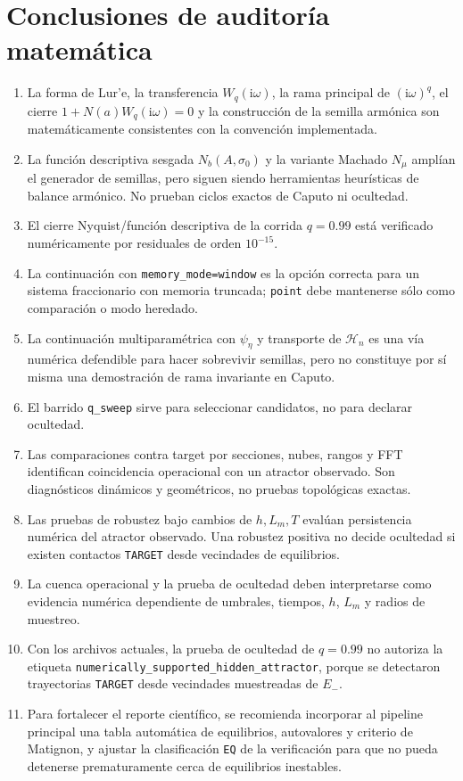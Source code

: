\documentclass[11pt]{article}
\newcommand{\ii}{\mathrm{i}}
\newcommand{\TARGET}{\texttt{TARGET}}
\begin{document}
\section{Conclusiones de auditoría matemática}

\begin{enumerate}
\item La forma de Lur'e, la transferencia \(W_q(\ii\omega)\), la rama
principal de \((\ii\omega)^q\), el cierre \(1+N(a)W_q(\ii\omega)=0\) y la
construcción de la semilla armónica son matemáticamente consistentes con la
convención implementada.
\item La función descriptiva sesgada \(N_b(A,\sigma_0)\) y la variante
Machado \(N_\mu\) amplían el generador de semillas, pero siguen siendo
herramientas heurísticas de balance armónico. No prueban ciclos exactos de
Caputo ni ocultedad.
\item El cierre Nyquist/función descriptiva de la corrida \(q=0.99\) está
verificado numéricamente por residuales de orden \(10^{-15}\).
\item La continuación con \texttt{memory\_mode=window} es la opción correcta
para un sistema fraccionario con memoria truncada; \texttt{point} debe
mantenerse sólo como comparación o modo heredado.
\item La continuación multiparamétrica con \(\psi_\eta\) y transporte de
\(\mathcal{H}_n\) es una vía numérica defendible para hacer sobrevivir
semillas, pero no constituye por sí misma una demostración de rama invariante
en Caputo.
\item El barrido \texttt{q\_sweep} sirve para seleccionar candidatos, no para
declarar ocultedad.
\item Las comparaciones contra target por secciones, nubes, rangos y FFT
identifican coincidencia operacional con un atractor observado. Son
diagnósticos dinámicos y geométricos, no pruebas topológicas exactas.
\item Las pruebas de robustez bajo cambios de \(h,L_m,T\) evalúan persistencia
numérica del atractor observado. Una robustez positiva no decide ocultedad si
existen contactos \TARGET{} desde vecindades de equilibrios.
\item La cuenca operacional y la prueba de ocultedad deben interpretarse como
evidencia numérica dependiente de umbrales, tiempos, \(h\), \(L_m\) y radios de
muestreo.
\item Con los archivos actuales, la prueba de ocultedad de \(q=0.99\) no
autoriza la etiqueta \texttt{numerically\_supported\_hidden\_attractor},
porque se detectaron trayectorias \texttt{TARGET} desde vecindades muestreadas
de \(E_-\).
\item Para fortalecer el reporte científico, se recomienda incorporar al
pipeline principal una tabla automática de equilibrios, autovalores y
criterio de Matignon, y ajustar la clasificación \texttt{EQ} de la verificación
para que no pueda detenerse prematuramente cerca de equilibrios inestables.
\end{enumerate}
\end{document}
